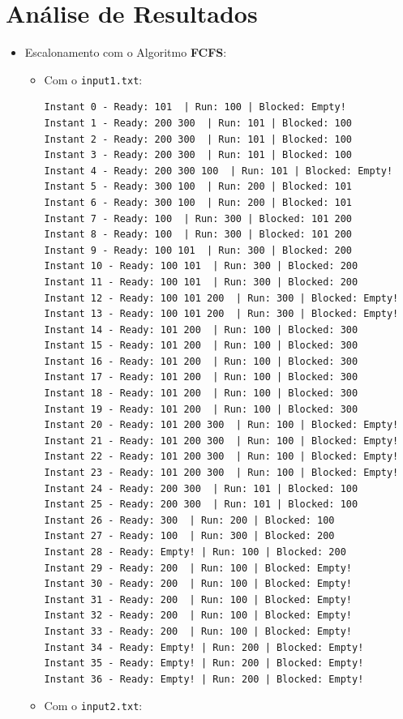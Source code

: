 \documentclass[11pt]{article}   %
\begin{document}
\section{Análise de Resultados} %
\begin{itemize}
    \item Escalonamento com o Algoritmo \textbf{FCFS}:
    \begin{itemize}
        \item Com o \verb|input1.txt|:
        \begin{verbatim}
Instant 0 - Ready: 101  | Run: 100 | Blocked: Empty!
Instant 1 - Ready: 200 300  | Run: 101 | Blocked: 100 
Instant 2 - Ready: 200 300  | Run: 101 | Blocked: 100 
Instant 3 - Ready: 200 300  | Run: 101 | Blocked: 100 
Instant 4 - Ready: 200 300 100  | Run: 101 | Blocked: Empty!
Instant 5 - Ready: 300 100  | Run: 200 | Blocked: 101 
Instant 6 - Ready: 300 100  | Run: 200 | Blocked: 101 
Instant 7 - Ready: 100  | Run: 300 | Blocked: 101 200 
Instant 8 - Ready: 100  | Run: 300 | Blocked: 101 200 
Instant 9 - Ready: 100 101  | Run: 300 | Blocked: 200 
Instant 10 - Ready: 100 101  | Run: 300 | Blocked: 200 
Instant 11 - Ready: 100 101  | Run: 300 | Blocked: 200 
Instant 12 - Ready: 100 101 200  | Run: 300 | Blocked: Empty!
Instant 13 - Ready: 100 101 200  | Run: 300 | Blocked: Empty!
Instant 14 - Ready: 101 200  | Run: 100 | Blocked: 300 
Instant 15 - Ready: 101 200  | Run: 100 | Blocked: 300 
Instant 16 - Ready: 101 200  | Run: 100 | Blocked: 300 
Instant 17 - Ready: 101 200  | Run: 100 | Blocked: 300 
Instant 18 - Ready: 101 200  | Run: 100 | Blocked: 300 
Instant 19 - Ready: 101 200  | Run: 100 | Blocked: 300 
Instant 20 - Ready: 101 200 300  | Run: 100 | Blocked: Empty!
Instant 21 - Ready: 101 200 300  | Run: 100 | Blocked: Empty!
Instant 22 - Ready: 101 200 300  | Run: 100 | Blocked: Empty!
Instant 23 - Ready: 101 200 300  | Run: 100 | Blocked: Empty!
Instant 24 - Ready: 200 300  | Run: 101 | Blocked: 100 
Instant 25 - Ready: 200 300  | Run: 101 | Blocked: 100 
Instant 26 - Ready: 300  | Run: 200 | Blocked: 100 
Instant 27 - Ready: 100  | Run: 300 | Blocked: 200 
Instant 28 - Ready: Empty! | Run: 100 | Blocked: 200 
Instant 29 - Ready: 200  | Run: 100 | Blocked: Empty!
Instant 30 - Ready: 200  | Run: 100 | Blocked: Empty!
Instant 31 - Ready: 200  | Run: 100 | Blocked: Empty!
Instant 32 - Ready: 200  | Run: 100 | Blocked: Empty!
Instant 33 - Ready: 200  | Run: 100 | Blocked: Empty!
Instant 34 - Ready: Empty! | Run: 200 | Blocked: Empty!
Instant 35 - Ready: Empty! | Run: 200 | Blocked: Empty!
Instant 36 - Ready: Empty! | Run: 200 | Blocked: Empty!    
        \end{verbatim}
        \item Com o \verb|input2.txt|:
        \begin{verbatim}


\end{verbatim}
\end{itemize}
\end{itemize}
\end{document}
